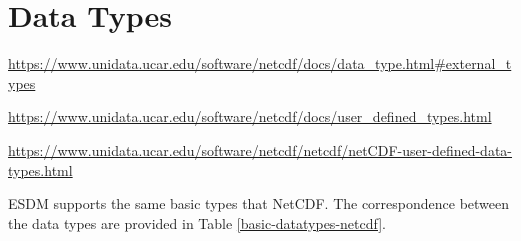 \section{Data Types}

\tab

\url{https://www.unidata.ucar.edu/software/netcdf/docs/data_type.html#external_types}

\url{https://www.unidata.ucar.edu/software/netcdf/docs/user_defined_types.html}

\url{https://www.unidata.ucar.edu/software/netcdf/netcdf/netCDF-user-defined-data-types.html}

ESDM supports the same basic types that NetCDF. The correspondence between the data types are provided in Table \ref{basic-datatypes-netcdf}.

\begin{comment}

\begin{table}[H]
\centering
\begin{tabular}{|l|c|l|l|}
\hline
NetCDF TYPE & Number (Value?) & ESDM Type & ESDM Representation \\ \hline \hline
NC\_BYTE       &  1   & SMD\_DTYPE\_INT8     & int8\_t    \\ \hline
NC\_UBYTE      &  7   & SMD\_DTYPE\_UINT8    & uint8\_t    \\ \hline
NC\_CHAR       &  2   & SMD\_DTYPE\_CHAR     & char    \\ \hline
NC\_SHORT      &  3   & SMD\_DTYPE\_INT16    & int16\_t    \\ \hline
NC\_USHORT     &  8   & SMD\_DTYPE\_UINT16   & uint16\_t    \\ \hline
NC\_INT        &  4   & SMD\_DTYPE\_INT32    & int32\_t    \\ \hline
NC\_LONG       &  4   & SMD\_DTYPE\_INT32    & int32\_t    \\ \hline
NC\_UINT       &  9   & SMD\_DTYPE\_UINT32   & uint32\_t    \\ \hline
NC\_INT64      &  10  & SMD\_DTYPE\_INT64    & int64\_t    \\ \hline
NC\_UINT64     &  5   & SMD\_DTYPE\_UINT64   & uint64\_t    \\ \hline
NC\_FLOAT      &  11  & SMD\_DTYPE\_FLOAT    & 32 bits    \\ \hline
NC\_DOUBLE     &  6   & SMD\_DTYPE\_DOUBLE   & 64 bits    \\ \hline
\hline
\end{tabular}
\caption{\label{basic-datatypes-size} Equivalence between ESDM and NetCDF4 data types -- Data types sorted by size.}
\end{table}

\end{comment}

